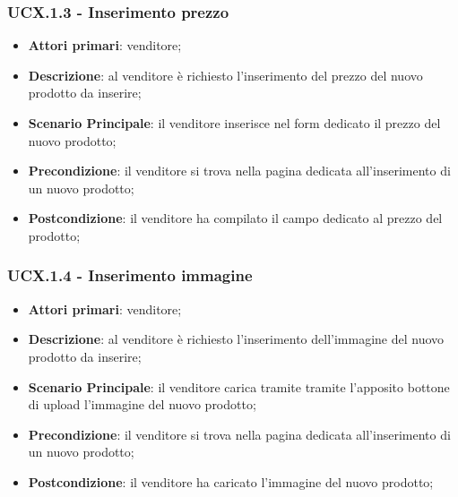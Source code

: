\subsubsection{UCX.1.3 - Inserimento prezzo}
\begin{itemize}
\item \textbf{Attori primari}: venditore;
\item \textbf{Descrizione}: al venditore è richiesto l'inserimento del prezzo del nuovo prodotto da inserire;
\item \textbf{Scenario Principale}: il venditore inserisce nel form dedicato il prezzo del nuovo prodotto;
\item \textbf{Precondizione}: il venditore si trova nella pagina dedicata all'inserimento di un nuovo prodotto;
\item \textbf{Postcondizione}: il venditore ha compilato il campo dedicato al prezzo del prodotto;
\end{itemize}

\subsubsection{UCX.1.4 - Inserimento immagine}
\begin{itemize}
\item \textbf{Attori primari}: venditore;
\item \textbf{Descrizione}: al venditore è richiesto l'inserimento dell'immagine del nuovo prodotto da inserire;
\item \textbf{Scenario Principale}: il venditore carica tramite tramite l'apposito bottone di upload l'immagine del nuovo prodotto;
\item \textbf{Precondizione}: il venditore si trova nella pagina dedicata all'inserimento di un nuovo prodotto;
\item \textbf{Postcondizione}: il venditore ha caricato l'immagine del nuovo prodotto;
\end{itemize}

